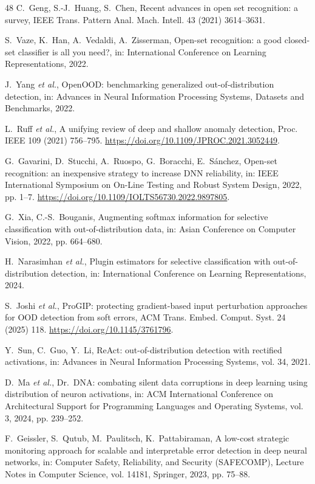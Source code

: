 \documentclass[preprint,12pt]{elsarticle}
\begin{document}
\begin{thebibliography}{48}
 C.~Geng, S.-J.~Huang, S.~Chen, Recent advances in open set recognition: a survey, IEEE Trans. Pattern Anal. Mach. Intell. 43 (2021) 3614--3631.

 S.~Vaze, K.~Han, A.~Vedaldi, A.~Zisserman, Open-set recognition: a good closed-set classifier is all you need?, in: International Conference on Learning Representations, 2022.

 J.~Yang \textit{et al.}, OpenOOD: benchmarking generalized out-of-distribution detection, in: Advances in Neural Information Processing Systems, Datasets and Benchmarks, 2022.

 L.~Ruff \textit{et al.}, A unifying review of deep and shallow anomaly detection, Proc. IEEE 109 (2021) 756--795. \url{https://doi.org/10.1109/JPROC.2021.3052449}.

 G.~Gavarini, D.~Stucchi, A.~Ruospo, G.~Boracchi, E.~S\'{a}nchez, Open-set recognition: an inexpensive strategy to increase DNN reliability, in: IEEE International Symposium on On-Line Testing and Robust System Design, 2022, pp. 1--7. \url{https://doi.org/10.1109/IOLTS56730.2022.9897805}.

 G.~Xia, C.-S.~Bouganis, Augmenting softmax information for selective classification with out-of-distribution data, in: Asian Conference on Computer Vision, 2022, pp. 664--680.

 H.~Narasimhan \textit{et al.}, Plugin estimators for selective classification with out-of-distribution detection, in: International Conference on Learning Representations, 2024.

 S.~Joshi \textit{et al.}, ProGIP: protecting gradient-based input perturbation approaches for OOD detection from soft errors, ACM Trans. Embed. Comput. Syst. 24 (2025) 118. \url{https://doi.org/10.1145/3761796}.

 Y.~Sun, C.~Guo, Y.~Li, ReAct: out-of-distribution detection with rectified activations, in: Advances in Neural Information Processing Systems, vol. 34, 2021.

 D.~Ma \textit{et al.}, Dr.\ DNA: combating silent data corruptions in deep learning using distribution of neuron activations, in: ACM International Conference on Architectural Support for Programming Languages and Operating Systems, vol. 3, 2024, pp. 239--252.

 F.~Geissler, S.~Qutub, M.~Paulitsch, K.~Pattabiraman, A low-cost strategic monitoring approach for scalable and interpretable error detection in deep neural networks, in: Computer Safety, Reliability, and Security (SAFECOMP), Lecture Notes in Computer Science, vol. 14181, Springer, 2023, pp. 75--88.


\end{thebibliography}
\end{document}
